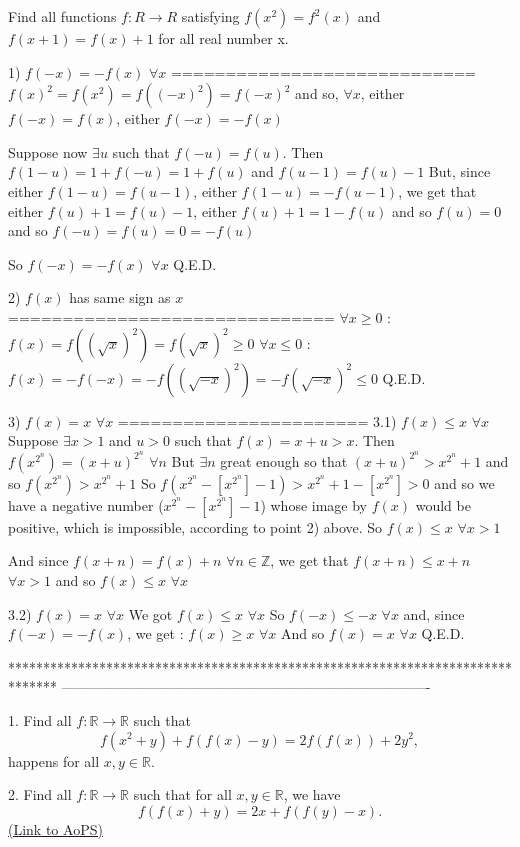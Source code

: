 \begin{solution}
	\begin{tcolorbox}Find all functions $ f: R \rightarrow R$ satisfying
$ f(x^2) = f^2(x)$ and $ f(x + 1) = f(x) + 1$ for all real number x.\end{tcolorbox}

1) $ f(-x)=-f(x)$ $ \forall x$
============================
$ f(x)^2=f(x^2)=f((-x)^2)=f(-x)^2$ and so, $ \forall x$, either $ f(-x)=f(x)$, either $ f(-x)=-f(x)$

Suppose now $ \exists u$ such that $ f(-u)=f(u)$. Then $ f(1-u)=1+f(-u)=1+f(u)$ and $ f(u-1)=f(u)-1$
But, since either $ f(1-u)=f(u-1)$, either $ f(1-u)=-f(u-1)$, we get that either $ f(u)+1=f(u)-1$, either $ f(u)+1=1-f(u)$ and so $ f(u)=0$ and so $ f(-u)=f(u)=0=-f(u)$

So $ f(-x)=-f(x)$ $ \forall x$
Q.E.D.

2) $ f(x)$ has same sign as $ x$
==============================
$ \forall x\geq 0$ : $ f(x)=f((\sqrt x)^2)=f(\sqrt x)^2\geq 0$
$ \forall x\leq 0$ : $ f(x)=-f(-x)=-f((\sqrt{-x})^2)=-f(\sqrt{-x})^2\leq 0$
Q.E.D.

3) $ f(x)=x$ $ \forall x$
=======================
3.1) $ f(x)\leq x$ $ \forall x$
Suppose $ \exists x>1$ and $ u>0$ such that $ f(x)=x+u>x$. Then $ f(x^{2^n})=(x+u)^{2^n}$ $ \forall n$
But $ \exists n$ great enough so that $ (x+u)^{2^n}>x^{2^n}+1$ and so $ f(x^{2^n})>x^{2^n}+1$
So $ f(x^{2^n}-[x^{2^n}]-1)>x^{2^n}+1-[x^{2^n}]>0$ and so we have a negative number ($ x^{2^n}-[x^{2^n}]-1$) whose image by $ f(x)$ would be positive, which is impossible, according to point 2) above.
So $ f(x)\leq x$ $ \forall x>1$

And since $ f(x+n)=f(x)+n$ $ \forall n\in\mathbb Z$, we get that $ f(x+n)\leq x+n$ $ \forall x>1$ and so $ f(x)\leq x$ $ \forall x$

3.2) $ f(x)=x$ $ \forall x$
We got $ f(x)\leq x$ $ \forall x$
So $ f(-x)\leq -x$ $ \forall x$ and, since $ f(-x)=-f(x)$, we get :  $ f(x)\geq x$ $ \forall x$
And so $ f(x)=x$ $ \forall x$
Q.E.D.
\end{solution}
*******************************************************************************
-------------------------------------------------------------------------------

\begin{problem}
	1. Find all $ f: \mathbb {R}\to\mathbb {R}$ such that
\[ f(x^2 + y) + f(f(x) - y) = 2f(f(x)) + 2y^2,\]
happens for all $ x,y\in \mathbb {R}$.

2. Find all $ f: \mathbb {R}\to\mathbb {R}$ such that for all $ x,y\in \mathbb {R}$, we have
\[f(f(x) + y) = 2x + f(f(y) - x).\]
	\flushright \href{https://artofproblemsolving.com/community/c6h307117}{(Link to AoPS)}
\end{problem}



